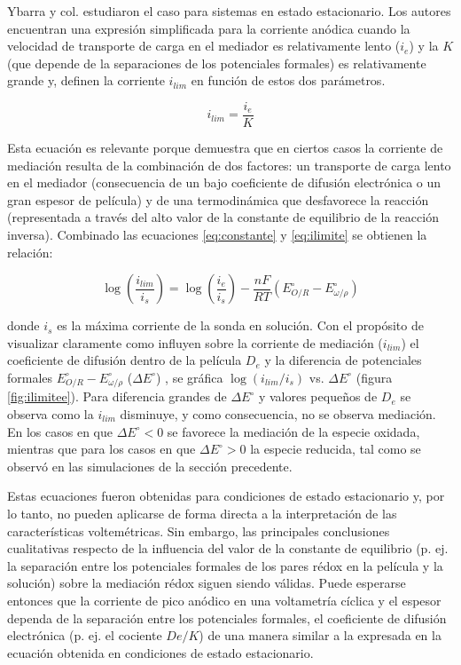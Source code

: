 		Ybarra y col.\cite{ybarra2008} estudiaron el caso para sistemas en estado estacionario. Los autores encuentran una expresión simplificada para la corriente anódica cuando la velocidad de transporte de carga en el mediador es relativamente lento ($i_e$) y la $K$ (que depende de la separaciones de los potenciales formales) es relativamente grande y, definen la corriente $i_{lim}$ en función de estos dos parámetros.

		\begin{equation}
		i_{lim}=\frac{i_e}{K}
		\label{eq:ilimite}
		\end{equation}

		Esta ecuación es relevante porque demuestra que en ciertos casos la corriente de mediación resulta de la combinación de dos factores: un transporte de carga lento en el mediador (consecuencia de un bajo coeficiente de difusión electrónica o un gran espesor de película) y de una termodinámica que desfavorece la reacción (representada a través del alto valor de la constante de equilibrio de la reacción inversa).\cite{ybarra2005}
		Combinado las ecuaciones \ref{eq:constante} y \ref{eq:ilimite} se obtienen la relación:

		\begin{equation}
			\log\left({\frac{i_{lim}}{i_s}}\right) =\log\left({\frac{i_e}{i_s}}\right)-{\frac{nF}{RT}}\left( E^{\circ}_{O/R} - E^{\circ}_{\omega / \rho} \right)
			\label{eq:delgrafico}
		\end{equation}

		\noindent donde $i_s$ es la máxima corriente de la sonda en solución. Con el propósito de visualizar claramente como influyen sobre la corriente de mediación ($i_{lim}$) el coeficiente de difusión dentro de la película $D_e$ y la diferencia de potenciales formales $E^{\circ}_{O/R} - E^{\circ}_{\omega / \rho}$ ($\Delta E^{\circ}$) , se gráfica $\log(i_{lim}/i_{s})$ vs. $\Delta E^{\circ}$ (figura \ref{fig:ilimitee}). Para diferencia grandes de $\Delta E^{\circ}$ y valores pequeños de $D_e$  se observa como la $i_{lim}$ disminuye, y como consecuencia, no se observa mediación. En los casos en que $\Delta E^{\circ}<0$ se favorece la mediación de la especie oxidada, mientras que para los casos en que $\Delta E^{\circ}>0$ la especie reducida, tal como se observó en las simulaciones de la sección precedente.

		Estas ecuaciones fueron obtenidas para condiciones de estado estacionario y, por lo tanto, no pueden aplicarse de forma directa a la interpretación de las características voltemétricas. Sin embargo, las principales conclusiones cualitativas respecto de la influencia del valor de la constante de equilibrio (p. ej. la separación entre los potenciales formales de los pares rédox en la película y la solución) sobre la mediación rédox siguen siendo válidas. Puede esperarse entonces que la corriente de pico anódico en una voltametría cíclica y el espesor dependa de la separación entre los potenciales formales, el coeficiente de difusión electrónica (p. ej. el cociente $De/K$) de una manera similar a la expresada en la ecuación obtenida en condiciones de estado estacionario. 
		
